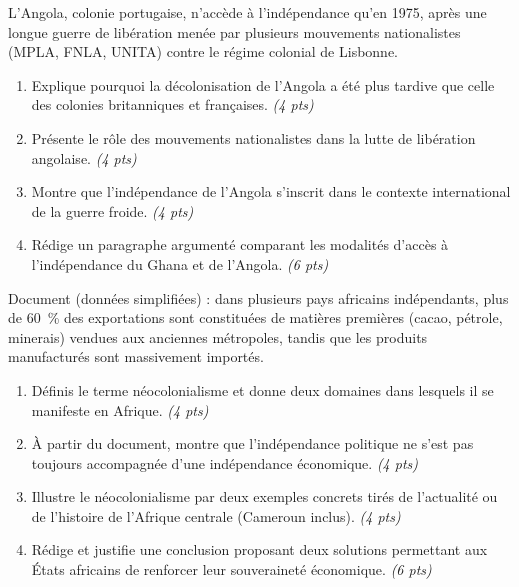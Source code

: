 \documentclass[11pt]{article}
\begin{document}
\begin{exercice}
L'Angola, colonie portugaise, n'accède à l'indépendance qu'en 1975, après une longue guerre de libération menée par plusieurs mouvements nationalistes (MPLA, FNLA, UNITA) contre le régime colonial de Lisbonne.
\begin{enumerate}
\item Explique pourquoi la décolonisation de l'Angola a été plus tardive que celle des colonies britanniques et françaises. \textit{(4 pts)}
\item Présente le rôle des mouvements nationalistes dans la lutte de libération angolaise. \textit{(4 pts)}
\item Montre que l'indépendance de l'Angola s'inscrit dans le contexte international de la guerre froide. \textit{(4 pts)}
\item Rédige un paragraphe argumenté comparant les modalités d'accès à l'indépendance du Ghana et de l'Angola. \textit{(6 pts)}
\end{enumerate}
\end{exercice}

\begin{exercice}
Document (données simplifiées) : dans plusieurs pays africains indépendants, plus de 60~\% des exportations sont constituées de matières premières (cacao, pétrole, minerais) vendues aux anciennes métropoles, tandis que les produits manufacturés sont massivement importés.
\begin{enumerate}
\item Définis le terme \og néocolonialisme \fg{} et donne deux domaines dans lesquels il se manifeste en Afrique. \textit{(4 pts)}
\item À partir du document, montre que l'indépendance politique ne s'est pas toujours accompagnée d'une indépendance économique. \textit{(4 pts)}
\item Illustre le néocolonialisme par deux exemples concrets tirés de l'actualité ou de l'histoire de l'Afrique centrale (Cameroun inclus). \textit{(4 pts)}
\item Rédige et justifie une conclusion proposant deux solutions permettant aux États africains de renforcer leur souveraineté économique. \textit{(6 pts)}
\end{enumerate}
\end{exercice}
\end{document}
